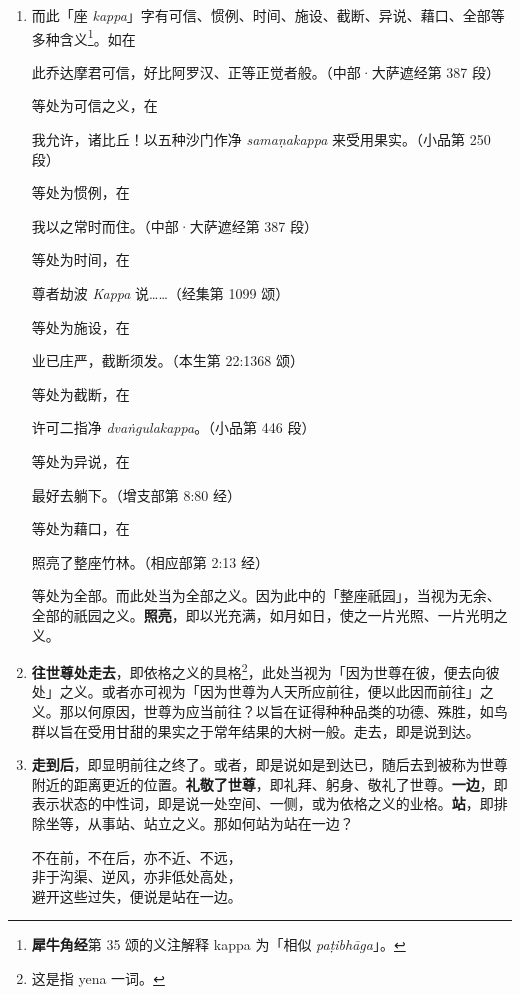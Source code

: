 \begin{enumerate}
\item 而此「座 \textit{kappa}」字有可信、惯例、时间、施设、截断、异说、藉口、全部等多种含义\footnote{\textbf{犀牛角经}第 35 颂的义注解释 kappa 为「相似 \textit{paṭibhāga}」。}。如在\begin{quoting}此乔达摩君可信，好比阿罗汉、正等正觉者般。（中部·大萨遮经第 387 段）\end{quoting}等处为可信之义，在\begin{quoting}我允许，诸比丘！以五种沙门作净 \textit{samaṇakappa} 来受用果实。（小品第 250 段）\end{quoting}等处为惯例，在\begin{quoting}我以之常时而住。（中部·大萨遮经第 387 段）\end{quoting}等处为时间，在\begin{quoting}尊者劫波 \textit{Kappa} 说……（经集第 1099 颂）\end{quoting}等处为施设，在\begin{quoting}业已庄严，截断须发。（本生第 22:1368 颂）\end{quoting}等处为截断，在\begin{quoting}许可二指净 \textit{dvaṅgulakappa}。（小品第 446 段）\end{quoting}等处为异说，在\begin{quoting}最好去躺下。（增支部第 8:80 经）\end{quoting}等处为藉口，在\begin{quoting}照亮了整座竹林。（相应部第 2:13 经）\end{quoting}等处为全部。而此处当为全部之义。因为此中的「整座祇园」，当视为无余、全部的祇园之义。\textbf{照亮}，即以光充满，如月如日，使之一片光照、一片光明之义。
\item \textbf{往世尊处走去}，即依格之义的具格\footnote{这是指 yena 一词。}，此处当视为「因为世尊在彼，便去向彼处」之义。或者亦可视为「因为世尊为人天所应前往，便以此因而前往」之义。那以何原因，世尊为应当前往？以旨在证得种种品类的功德、殊胜，如鸟群以旨在受用甘甜的果实之于常年结果的大树一般。走去，即是说到达。
\item \textbf{走到后}，即显明前往之终了。或者，即是说如是到达已，随后去到被称为世尊附近的距离更近的位置。\textbf{礼敬了世尊}，即礼拜、躬身、敬礼了世尊。\textbf{一边}，即表示状态的中性词，即是说一处空间、一侧，或为依格之义的业格。\textbf{站}，即排除坐等，从事站、站立之义。那如何站为站在一边？\begin{quoting}不在前，不在后，亦不近、不远，\\非于沟渠、逆风，亦非低处高处，\\避开这些过失，便说是站在一边。\end{quoting}

\end{enumerate}

